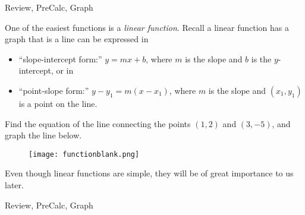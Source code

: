 

\begin{tagblock}{Review, PreCalc, Graph}
\begin{question}

One of the easiest functions is a \emph{linear function}.  Recall a linear function has a graph that is a line can be expressed in 
\begin{itemize}
\item ``slope-intercept form:'' $y=mx+b$, where $m$ is the slope and $b$ is the $y$-intercept, or in 
\item``point-slope form:'' $y-y_1 = m(x-x_1)$, where $m$ is the slope and $(x_1,y_1)$ is a point on the line.  
\end{itemize}
Find the equation of the line connecting the points $(1,2)$ and $(3,-5)$, and graph the line below.
\begin{figure}[h]\texttt{[image: functionblank.png]} \end{figure}

Even though linear functions are simple, they will be of great importance to us later.  

	
 

\begin{tags}
	    Review, PreCalc, Graph
\end{tags}
	
\begin{diary}
	    
\end{diary}
	
\begin{solution}
		
\end{solution}
	
\end{question}

\end{tagblock}



